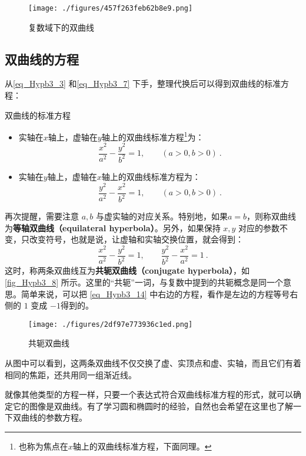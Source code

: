 \begin{figure}[ht]
\centering
\texttt{[image: ./figures/457f263feb62b8e9.png]}
\caption{复数域下的双曲线} \label{fig_Hypb3_2}
\end{figure}

\subsection{双曲线的方程}

从\autoref{eq_Hypb3_3} 和\autoref{eq_Hypb3_7} 下手，整理代换后可以得到双曲线的标准方程：

\begin{theorem}{双曲线的标准方程}
\begin{itemize}
\item 实轴在$x$轴上，虚轴在$y$轴上的双曲线标准方程\footnote{也称为焦点在$x$轴上的双曲线标准方程，下面同理。}为：
\begin{equation}\label{eq_Hypb3_4}
\frac{x^2}{a^2} - \frac{y^2}{b^2} = 1,\qquad(a>0,b>0)~.
\end{equation}
\item 实轴在$y$轴上，虚轴在$x$轴上的双曲线标准方程为：
\begin{equation}
\frac{y^2}{a^2} -\frac{x^2}{b^2}  = 1,\qquad(a>0,b>0)~.
\end{equation}
\end{itemize}
\end{theorem}

再次提醒，需要注意 $a,b$ 与虚实轴的对应关系。特别地，如果$a=b$，则称双曲线为\textbf{等轴双曲线（equilateral hyperbola）}。另外，如果保持 $x,y$ 对应的参数不变，只改变符号，也就是说，让虚轴和实轴交换位置，就会得到：
\begin{equation}\label{eq_Hypb3_14}
\frac{x^2}{a^2} - \frac{y^2}{b^2} = 1,\qquad \frac{y^2}{b^2} - \frac{x^2}{a^2} = 1 ~.
\end{equation}
这时，称两条双曲线互为\textbf{共轭双曲线（conjugate hyperbola）}，如\autoref{fig_Hypb3_8} 所示。这里的“共轭”一词，与复数中提到的共轭概念是同一个意思。简单来说，可以把 \autoref{eq_Hypb3_14} 中右边的方程，看作是左边的方程等号右侧的 $1$ 变成 $-1$得到的。
\begin{figure}[ht]
\centering
\texttt{[image: ./figures/2df97e773936c1ed.png]}
\caption{共轭双曲线} \label{fig_Hypb3_8}
\end{figure}
从图中可以看到，这两条双曲线不仅交换了虚、实顶点和虚、实轴，而且它们有着相同的焦距，还共用同一组渐近线。

就像其他类型的方程一样，只要一个表达式符合双曲线标准方程的形式，就可以确定它的图像是双曲线。有了学习圆和椭圆时的经验，自然也会希望在这里也了解一下双曲线的参数方程。

